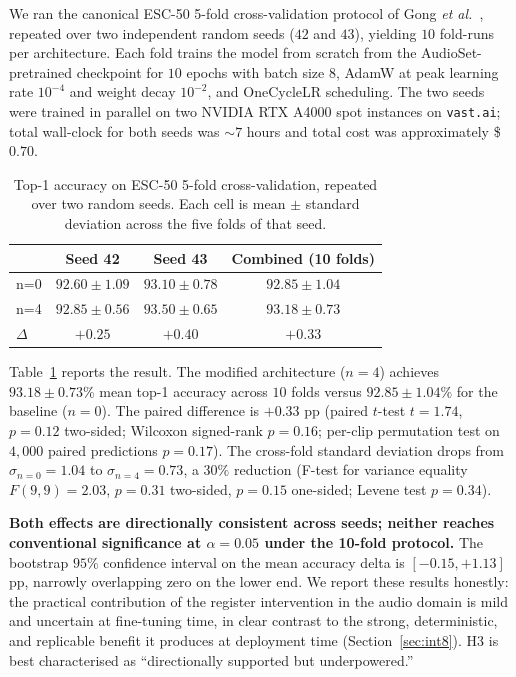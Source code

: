 \documentclass[conference]{IEEEtran}
\begin{document}
We ran the canonical ESC-50 5-fold cross-validation protocol of Gong \emph{et al.}~\cite{gong2021ast}, repeated over two independent random seeds ($42$ and $43$), yielding $10$ fold-runs per architecture. Each fold trains the model from scratch from the AudioSet-pretrained checkpoint for $10$ epochs with batch size $8$, AdamW \cite{loshchilov2019decoupled} at peak learning rate $10^{-4}$ and weight decay $10^{-2}$, and OneCycleLR scheduling. The two seeds were trained in parallel on two NVIDIA RTX A4000 spot instances on \texttt{vast.ai}; total wall-clock for both seeds was $\sim 7$ hours and total cost was approximately \$$0.70$.

\begin{table}[t]
\caption{Top-1 accuracy on ESC-50 5-fold cross-validation, repeated over two random seeds. Each cell is mean $\pm$ standard deviation across the five folds of that seed.}
\label{tab:5fold}
\centering
\setlength{\tabcolsep}{4pt}
\renewcommand{\arraystretch}{1.15}
\begin{tabular}{l c c c}
\toprule
& \textbf{Seed 42} & \textbf{Seed 43} & \textbf{Combined (10 folds)} \\
\midrule
n=0 & $92.60 \pm 1.09$ & $93.10 \pm 0.78$ & $\mathbf{92.85 \pm 1.04}$ \\
n=4 & $92.85 \pm 0.56$ & $93.50 \pm 0.65$ & $\mathbf{93.18 \pm 0.73}$ \\
$\Delta$ & $+0.25$ & $+0.40$ & $+0.33$ \\
\bottomrule
\end{tabular}
\end{table}

Table~\ref{tab:5fold} reports the result. The modified architecture ($n{=}4$) achieves $93.18 \pm 0.73\%$ mean top-1 accuracy across $10$ folds versus $92.85 \pm 1.04\%$ for the baseline ($n{=}0$). The paired difference is $+0.33$ pp (paired $t$-test $t = 1.74$, $p = 0.12$ two-sided; Wilcoxon signed-rank $p = 0.16$; per-clip permutation test on $4{,}000$ paired predictions $p = 0.17$). The cross-fold standard deviation drops from $\sigma_{n=0} = 1.04$ to $\sigma_{n=4} = 0.73$, a $30\%$ reduction (F-test for variance equality $F(9,9) = 2.03$, $p = 0.31$ two-sided, $p = 0.15$ one-sided; Levene test $p = 0.34$).

\textbf{Both effects are directionally consistent across seeds; neither reaches conventional significance at $\alpha = 0.05$ under the 10-fold protocol.} The bootstrap $95\%$ confidence interval on the mean accuracy delta is $[-0.15, +1.13]$ pp, narrowly overlapping zero on the lower end. We report these results honestly: the practical contribution of the register intervention in the audio domain is mild and uncertain at fine-tuning time, in clear contrast to the strong, deterministic, and replicable benefit it produces at deployment time (Section~\ref{sec:int8}). H3 is best characterised as ``directionally supported but underpowered.''
\end{document}
